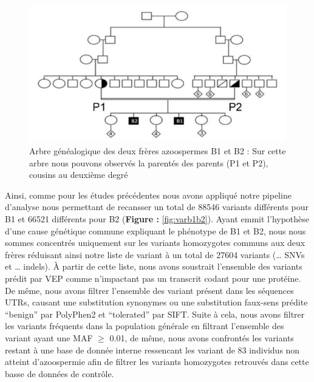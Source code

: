 \documentclass[12pt,twoside]{reedthesis}
\theoremstyle{definition}
\theoremstyle{definition}
\theoremstyle{remark}
\begin{document}
  \begin{figure}
  
  {\centering \includegraphics[scale=0.75]{figure/spink2_arbre_genealogique} 
  
  }
  
  \caption[Arbre généalogique des deux frères azoospermes B1 et B2]{Arbre généalogique des deux frères azoospermes B1 et B2 : Sur cette arbre nous pouvons observés la parentés des parents (P1 et P2), cousins au deuxième degré}\label{fig:spink2tree}
  \end{figure}
  
  Ainsi, comme pour les études précédentes nous avons appliqué notre
  pipeline d'analyse nous permettant de recansser un total de 88546
  variants différents pour B1 et 66521 différents pour B2 (\textbf{Figure
  : }\ref{fig:varb1b2}). Ayant emmit l'hypothèse d'une cause génétique
  commune expliquant le phénotype de B1 et B2, nous nous sommes concentrés
  uniquement sur les variants homozygotes communs aux deux frères
  réduisant ainsi notre liste de variant à un total de 27604 variants
  (\ldots{} SNVs et \ldots{} indels). À partir de cette liste, nous avons
  soustrait l'ensemble des variants prédit par VEP comme n'impactant pas
  un transcrit codant pour une protéine. De même, nous avons filtrer
  l'ensemble des variant présent dans les séquences UTRs, causant une
  substitution synonymes ou une substitution faux-sens prédite ``benign''
  par PolyPhen2 et ``tolerated'' par SIFT. Suite à cela, nous avons
  filtrer les variants fréquents dans la population générale en filtrant
  l'ensemble des variant ayant une MAF \(\ge\) 0.01, de même, nous avons
  confrontés les variants restant à une base de donnée interne ressencant
  les variant de 83 individus non atteint d'azoospermie afin de filtrer
  les variants homozygotes retrouvés dans cette basse de données de
  contrôle.
  
\end{document}
